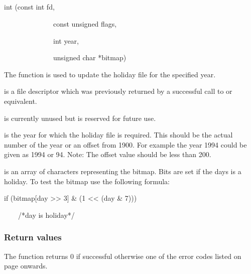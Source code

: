 \subsection{\funcnameXBholupd{}}

\begin{expara}

int \funcnameXBholupd{}(const int fd,

\ \ \ \ \ \ \ \ \ \ \ \ \ \ const unsigned flags,

\ \ \ \ \ \ \ \ \ \ \ \ \ \ int year,

\ \ \ \ \ \ \ \ \ \ \ \ \ \ unsigned char *bitmap)

\end{expara}

The function \funcXBholupd{} is used to update the holiday file for the specified year.

 is a file descriptor which was previously returned by a successful call to \funcXBopen{} or equivalent.

 is currently unused but is reserved for future use.

 is the year for which the holiday file is required. This should be the actual number of the year or an offset
from 1900. For example the year 1994 could be given as 1994 or 94. Note: The offset value should be less than 200.

 is an array of characters representing the bitmap. Bits are set if the days is a holiday. To test the bitmap use
the following formula:

\begin{expara}

if (bitmap[day {\textgreater}{\textgreater} 3] \& (1
{\textless}{\textless} (day \& 7)))

\ \ \ \ /*day is holiday*/

\end{expara}

\subsubsection{Return values}
The function returns 0 if successful otherwise one of the error codes listed on page \pageref{errorcodes} onwards.

